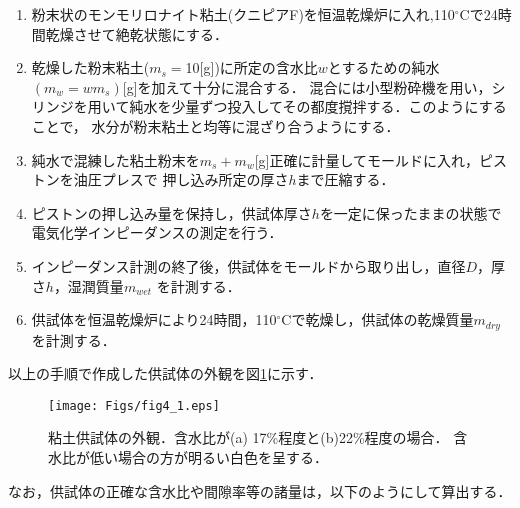 \begin{enumerate}
\item
	粉末状のモンモリロナイト粘土(クニピアF)を恒温乾燥炉に入れ,110$^\circ$Cで24時間乾燥させて絶乾状態にする．
\item
	乾燥した粉末粘土($m_s=$10[g])に所定の含水比$w$とするための純水$(m_w=w m_s)$[g]を加えて十分に混合する．
	混合には小型粉砕機を用い，シリンジを用いて純水を少量ずつ投入してその都度撹拌する．このようにすることで，
	水分が粉末粘土と均等に混ざり合うようにする．
\item
	純水で混練した粘土粉末を$m_s+m_w$[g]正確に計量してモールドに入れ，ピストンを油圧プレスで
	押し込み所定の厚さ$h$まで圧縮する．
\item
	ピストンの押し込み量を保持し，供試体厚さ$h$を一定に保ったままの状態で電気化学インピーダンスの測定を行う．
\item
	インピーダンス計測の終了後，供試体をモールドから取り出し，直径$D$，厚さ$h$，湿潤質量$m_{wet}$
	を計測する．
\item
	供試体を恒温乾燥炉により24時間，110$^\circ$Cで乾燥し，供試体の乾燥質量$m_{dry}$を計測する．
\end{enumerate}
以上の手順で作成した供試体の外観を図\ref{fig:fig4_1}に示す．
\begin{figure}[h]
	\begin{center}
	\texttt{[image: Figs/fig4\_1.eps]} 
	\end{center}
	\caption{
		粘土供試体の外観．含水比が(a) 17\%程度と(b)22\%程度の場合．
		含水比が低い場合の方が明るい白色を呈する．
	} 
	\label{fig:fig4_1}
\end{figure}
なお，供試体の正確な含水比や間隙率等の諸量は，以下のようにして算出する．\\

